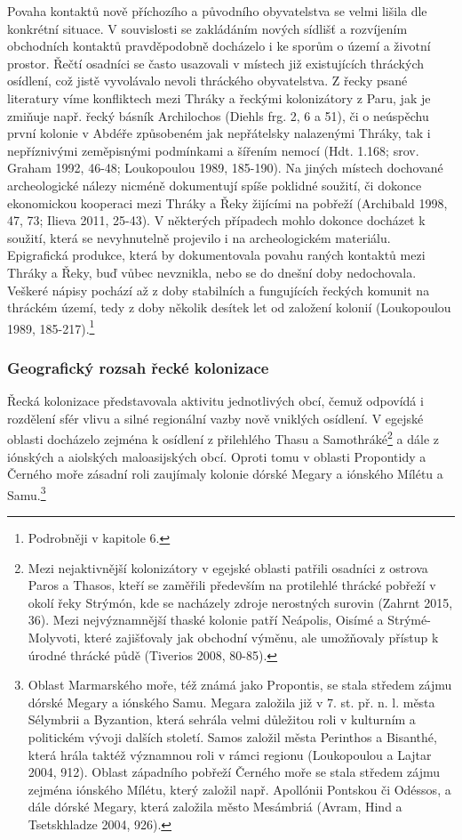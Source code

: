 Povaha kontaktů nově příchozího a původního obyvatelstva se velmi lišila dle konkrétní situace. V souvislosti se zakládáním nových sídlišť a rozvíjením obchodních kontaktů pravděpodobně docházelo i ke sporům o území a životní prostor. Řečtí osadníci se často usazovali v místech již existujících thráckých osídlení, což jistě vyvolávalo nevoli thráckého obyvatelstva. Z řecky psané literatury víme konfliktech mezi Thráky a řeckými kolonizátory z Paru, jak je zmiňuje např. řecký básník Archilochos (Diehls frg. 2, 6 a 51), či o neúspěchu první kolonie v Abdéře způsobeném jak nepřátelsky nalazenými Thráky, tak i nepříznivými zeměpisnými podmínkami a šířením nemocí (Hdt. 1.168; srov. Graham 1992, 46-48; Loukopoulou 1989, 185-190). Na jiných místech dochované archeologické nálezy nicméně dokumentují spíše poklidné soužití, či dokonce ekonomickou kooperaci mezi Thráky a Řeky žijícími na pobřeží (Archibald 1998, 47, 73; Ilieva 2011, 25-43). V některých případech mohlo dokonce docházet k soužití, která se nevyhnutelně projevilo i na archeologickém materiálu. Epigrafická produkce, která by dokumentovala povahu raných kontaktů mezi Thráky a Řeky, buď vůbec nevznikla, nebo se do dnešní doby nedochovala. Veškeré nápisy pochází až z doby stabilních a fungujících řeckých komunit na thráckém území, tedy z doby několik desítek let od založení kolonií (Loukopoulou 1989, 185-217).\footnote{Podrobněji v kapitole 6.}

\subsubsection[geografický-rozsah-řecké-kolonizace]{Geografický rozsah řecké kolonizace}

Řecká kolonizace představovala aktivitu jednotlivých obcí, čemuž odpovídá i rozdělení sfér vlivu a silné regionální vazby nově vniklých osídlení. V egejské oblasti docházelo zejména k osídlení z přilehlého Thasu a Samothráké\footnote{Mezi nejaktivnější kolonizátory v egejské oblasti patřili osadníci z ostrova Paros a Thasos, kteří se zaměřili především na protilehlé thrácké pobřeží v okolí řeky Strýmón, kde se nacházely zdroje nerostných surovin (Zahrnt 2015, 36). Mezi nejvýznamnější thaské kolonie patří Neápolis, Oisímé a Strýmé-Molyvoti, které zajišťovaly jak obchodní výměnu, ale umožňovaly přístup k úrodné thrácké půdě (Tiverios 2008, 80-85).} a dále z iónských a aiolských maloasijských obcí. Oproti tomu v oblasti Propontidy a Černého moře zásadní roli zaujímaly kolonie dórské Megary a iónského Mílétu a Samu.\footnote{Oblast Marmarského moře, též známá jako Propontis, se stala středem zájmu dórské Megary a iónského Samu. Megara založila již v 7. st. př. n. l. města Sélymbrii a Byzantion, která sehrála velmi důležitou roli v kulturním a politickém vývoji dalších století. Samos založil města Perinthos a Bisanthé, která hrála taktéž významnou roli v rámci regionu (Loukopoulou a Lajtar 2004, 912). Oblast západního pobřeží Černého moře se stala středem zájmu zejména iónského Mílétu, který založil např. Apollónii Pontskou či Odéssos, a dále dórské Megary, která založila město Mesámbriá (Avram, Hind a Tsetskhladze 2004, 926).}

